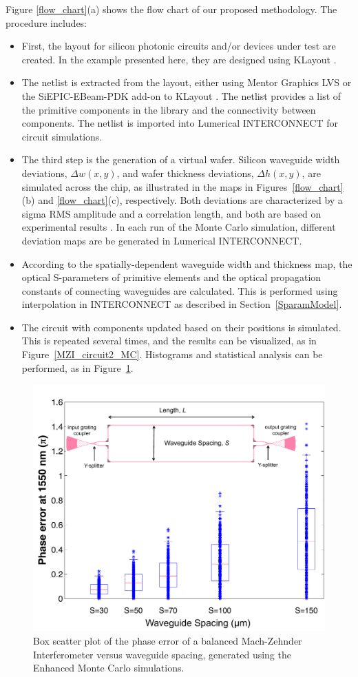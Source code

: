 \documentclass[journal]{spie}
\begin{document}
Figure \ref{flow_chart}(a) shows the flow chart of our proposed methodology. The procedure includes: 
\begin{itemize}
\item First, the layout for silicon photonic circuits and/or devices under test are created.  In the example presented here, they are designed using KLayout \cite{www_klayout}. 
\item
The netlist is extracted from the layout, either using Mentor Graphics LVS or the SiEPIC-EBeam-PDK add-on \cite{siepic-ebeam-pdk} to KLayout \cite{www_klayout}.  The netlist provides a list of the primitive components in the library and the connectivity between components.  The netlist is imported into Lumerical INTERCONNECT for circuit simulations. 
\item
The third step is the generation of a virtual wafer.  Silicon waveguide width deviations, $\Delta w(x,y)$, and wafer thickness deviations, $\Delta h(x,y)$, are simulated across the chip, as illustrated in the maps in Figures~\ref{flow_chart}(b) and \ref{flow_chart}(c), respectively. Both deviations are characterized by a sigma RMS amplitude and a correlation length, and both are based on experimental results \cite{lukas14:OFC,hochberg:wafer}. In each run of the Monte Carlo simulation, different deviation maps are be generated in Lumerical INTERCONNECT.
\item
According to the spatially-dependent waveguide width and thickness map, the optical S-parameters of primitive elements and the optical propagation constants of connecting waveguides are calculated.  This is performed using interpolation in INTERCONNECT as described in Section~\ref{SparamModel}. 
\item
The circuit with components updated based on their positions is simulated.  This is repeated several times, and the results can be visualized, as in Figure~\ref{MZI_circuit2_MC}. Histograms and statistical analysis can be performed, as in Figure~\ref{error}.
\end{itemize}

\begin{figure}[t]
    \centering
    \label{error}\includegraphics[width=0.8\linewidth]{error.pdf}
    \caption{Box scatter plot of the phase error of a balanced Mach-Zehnder Interferometer versus waveguide spacing, generated using the Enhanced Monte Carlo simulations.} 
    \label{error}
\end{figure}
\end{document}
